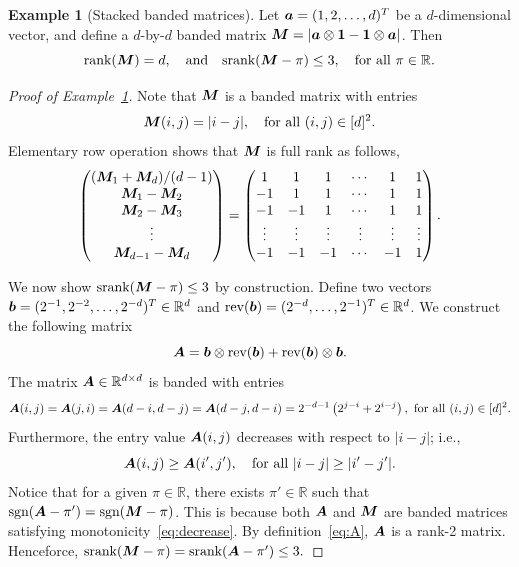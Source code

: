 \documentclass[11pt]{article}
\theoremstyle{plain}
\theoremstyle{definition}
\newtheorem{example}{Example}[section]
\def\sign{\textup{sgn}}
\def\srank{\textup{srank}}
\def\rank{\textup{rank}}
\begin{document}
\begin{example}[Stacked banded matrices]\label{example:banded} Let $\bm{a}=(1,2,\ldots,d)^T$ be a $d$-dimensional vector, and define a $d$-by-$d$ banded matrix $\bm M=|\bm{a}\otimes \mathbf{1}-\mathbf{1}\otimes \bm{a}|$. Then
\[
\rank(\mM)=d,\quad \text{and}\quad \srank(\mM-\pi)\leq 3, \quad \text{for all }\pi\in \mathbb{R}.
\]
\end{example}
\begin{proof}[Proof of Example~\ref{example:banded}]
Note that $\bm M$ is a banded matrix with entries
\[
\bm M(i,j)={|i-j|}, \quad \text{for all }(i,j)\in[d]^2.
\]
Elementary row operation shows that $\bm M$ is full rank as follows,
\begin{align}
\begin{pmatrix}
(\bm M_1+\bm M_d)/(d-1)\\
\bm M_1-\bm M_2\\
\bm M_2-\bm M_3\\
\vdots\\
\bm M_{d-1}-\bm M_{d}
\end{pmatrix} = 
\begin{pmatrix}
1&1&1&\cdots&1&1\\
-1&1&1&\cdots&1&1\\
-1&-1&1&\cdots&1&1\\
\vdots & \vdots & \vdots & \vdots & \vdots & \vdots\\
-1&-1&-1&\cdots&-1&1
\end{pmatrix}.
\end{align}

We now show $\srank(\mM-\pi)\leq 3$ by construction. Define two vectors $\bm{b}=(2^{-1},2^{-2},\ldots,2^{-d})^T\in\mathbb{R}^d$ and $\text{rev}(\bm{b})=(2^{-d},\ldots,2^{-1})^T\in\mathbb{R}^d$. We construct the following matrix
\begin{equation}\label{eq:A}
\bm A=\bm{b}\otimes\text{rev}(\bm{b})+\text{rev}(\bm{b})\otimes\bm{b}.
\end{equation}
The matrix $\bm A\in\mathbb{R}^{d\times d}$ is banded with entries
\[
\mA(i,j)=\mA(j,i)=\mA(d-i,d-j)=\mA(d-j,d-i)=2^{-d-1}\left(2^{j-i}+2^{i-j}\right),\ \text{for all }(i,j)\in[d]^2.
\] 
Furthermore, the entry value $\bm A(i,j)$ decreases with respect to $|i-j|$; i.e., 
\begin{equation}\label{eq:decrease}
\bm A(i,j) \geq \bm A(i',j'), \quad \text{for all }|i-j|\geq |i'-j'|.
\end{equation}
Notice that for a given $\pi\in\mathbb{R}$, there exists $\pi'\in\mathbb{R}$ such that $\sign(\mA-\pi')=\sign(\mM-\pi)$. This is because both $\bm A$ and $\bm M$ are banded matrices satisfying monotonicity~\eqref{eq:decrease}. By definition~\eqref{eq:A}, $\bm A$ is a rank-2 matrix. Henceforce, $\srank(\mM-\pi)=\srank(\mA-\pi')\leq 3.$
\end{proof}
\end{document}
